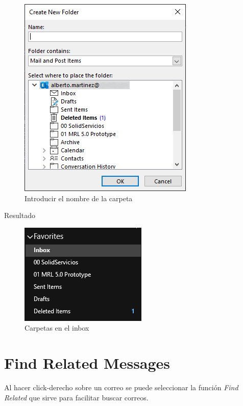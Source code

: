 \documentclass{report}
\begin{document}
\begin{figure}[H]
	\centering
	\includegraphics[width=0.65\linewidth, height=0.45\textheight,keepaspectratio]{Imagenes/outlook_createfolders02}
	\caption{Introducir el nombre de la carpeta}
	\label{fig:outlookcreatefolders02}
\end{figure}

{\LARGE Resultado}

\begin{figure}[H]
	\centering
	\includegraphics[width=0.55\linewidth, height=0.35\textheight,keepaspectratio]{Imagenes/outlook_createfolders03}
	\caption{Carpetas en el inbox}
	\label{fig:outlookcreatefolders03}
\end{figure}

\chapter{Find Related Messages}

Al hacer click-derecho sobre un correo se puede seleccionar la función \emph{Find Related} que sirve para facilitar buscar correos.
\end{document}
